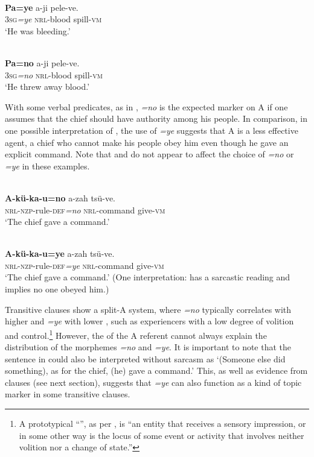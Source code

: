 \documentclass[output=paper]{LSP/langsci}
\begin{document}
\ea\label{13-te-ex:14}
\\
\gll  \textbf{Pa=ye} a-ji pele-ve.\\
3\textsc{sg}\textit{=ye} \textsc{nrl}-blood spill-\textsc{vm}\\
\glt ‘He was bleeding.’ %
\z

\ea\label{13-te-ex:15}
\\
\gll  \textbf{Pa=no} a-ji pele-ve. \\
3\textsc{sg}\textit{=no} \textsc{nrl}-blood spill-\textsc{vm}\\
\glt ‘He threw away blood.’ %
\z

With some verbal predicates, as in , \textit{=no} is the expected marker on A if one assumes that the chief should have authority among his people. In comparison, in one possible interpretation of , the use of \textit{=ye} suggests that A is a less effective agent, \ie a chief who cannot make his people obey him even though he gave an explicit command. Note that  and  do not appear to affect the choice of \textit{=no} or \textit{=ye} in these examples.

\ea\label{13-te-ex:16}
\\
\gll \textbf{A-kü-ka-u=no} a-zah tsü-ve.\\
\textsc{nrl-nzp}-rule-\textsc{def}\textit{=no} \textsc{nrl}-command give-\textsc{vm}\\
\glt ‘The chief gave a command.’ %
\z

\ea\label{13-te-ex:17}
\\
\gll  \textbf{A-kü-ka-u=ye} a-zah tsü-ve.\\
\textsc{nrl-nzp}-rule-\textsc{def}\textit{=ye} \textsc{nrl}-command give-\textsc{vm}\\
\glt ‘The chief gave a command.’ (One interpretation: has a sarcastic reading and implies no one obeyed him.) %
\z

Transitive clauses show a split-A system, where \textit{=no} typically correlates with higher  and \textit{=ye} with lower , such as experiencers with a low degree of volition and control.\footnote{A prototypical “”, as per \citet[50]{Payne1997Describing}, is “an entity that receives a sensory impression, or in some other way is the locus of some event or activity that involves neither volition nor a change of state.”} However, the  of the A referent cannot always explain the distribution of the morphemes \textit{=no} and \textit{=ye}. It is important to note that the sentence in  could also be interpreted without sarcasm as ‘(Someone else did something), as for the chief, (he) gave a command.’ This, as well as evidence from  clauses (see next section), suggests that \textit{=ye} can also function as a kind of topic marker in some transitive clauses.
\end{document}
